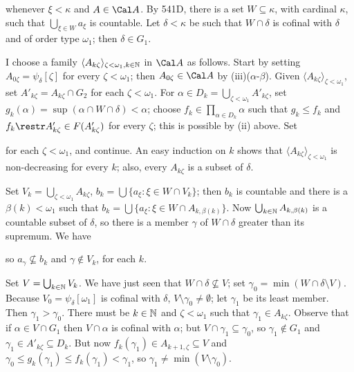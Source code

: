 {

\noindent whenever $\xi<\kappa$ and $A\in\Cal A$.   By 541D, there is a
set $W\subseteq\kappa$, with cardinal $\kappa$, such that
$\bigcup_{\xi\in W}a_{\xi}$ is countable.   Let $\delta<\kappa$ be such
that $W\cap\delta$ is cofinal with $\delta$ and of order type
$\omega_1$;  then $\delta\in G_1$.

\medskip

 I choose a family
$\langle A_{k\zeta}\rangle_{\zeta<\omega_1,k\in\Bbb N}$ in $\Cal A$ as
follows.    Start by setting
$A_{0\zeta}=\psi_{\delta}[\zeta]$ for every $\zeta<\omega_1$;  then
$A_{0\zeta}\in\Cal A$ by (iii)($\alpha$-$\beta$).   Given
$\langle A_{k\zeta}\rangle_{\zeta<\omega_1}$, set
$A'_{k\zeta}=A_{k\zeta}\cap G_2$ for each $\zeta<\omega_1$.   For
$\alpha\in D_k=\bigcup_{\zeta<\omega_1}A'_{k\zeta}$, set
$g_k(\alpha)=\sup(\alpha\cap W\cap\delta)<\alpha$;
choose $f_k\in\prod_{\alpha\in D_k}\alpha$ such that $g_k\le f_k$ and
$f_k\restr A'_{k\zeta}\in F(A'_{k\zeta})$ for every $\zeta$;  this is
possible by (ii) above.   Set


\noindent for each $\zeta<\omega_1$, and continue.
An easy induction on $k$ shows that
$\langle A_{k\zeta}\rangle_{\zeta<\omega_1}$ is non-decreasing for every
$k$;  also, every $A_{k\zeta}$ is a subset of $\delta$.

\medskip

 Set $V_k=\bigcup_{\zeta<\omega_1}A_{k\zeta}$,
$b_k=\bigcup\{a_{\xi}:\xi\in W\cap V_k\}$;  then $b_k$ is countable and
there is a $\beta(k)<\omega_1$ such that
$b_k=\bigcup\{a_{\xi}:\xi\in W\cap A_{k,\beta(k)}\}$.   Now
$\bigcup_{k\in\Bbb N}A_{k,\beta(k)}$ is a
countable subset of $\delta$, so there is a member $\gamma$ of
$W\cap\delta$ greater than its supremum.   We have


\noindent so $a_{\gamma}\not\subseteq b_k$ and
$\gamma\notin V_k$, for each $k$.

Set $V=\bigcup_{k\in\Bbb N}V_k$.   We have just seen that
$W\cap\delta\not\subseteq V$;  set
$\gamma_0=\min(W\cap\delta\setminus V)$.   Because
$V_0=\psi_{\delta}[\omega_1]$ is cofinal with $\delta$,
$V\setminus\gamma_0\ne\emptyset$;  let $\gamma_1$ be its least member.
Then $\gamma_1>\gamma_0$.   There must be $k\in\Bbb N$ and
$\zeta<\omega_1$ such that $\gamma_1\in A_{k\zeta}$.   Observe
that if $\alpha\in V\cap G_1$ then $V\cap\alpha$ is cofinal with
$\alpha$;  but $V\cap\gamma_1\subseteq\gamma_0$, so $\gamma_1\notin G_1$
and $\gamma_1\in A'_{k\zeta}\subseteq D_k$.   But now
$f_k(\gamma_1)\in A_{k+1,\zeta}\subseteq V$ and
$\gamma_0\le g_k(\gamma_1)\le f_k(\gamma_1)<\gamma_1$, so
$\gamma_1\ne\min(V\setminus\gamma_0)$.\ \Bang

}
